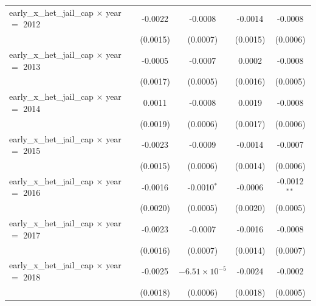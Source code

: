 \begin{tabular}{lcccc}
   early\_x\_het\_jail\_cap $\times$ year $=$ 2012      & -0.0022               & -0.0008                   & -0.0014                & -0.0008\\   
                                                        & (0.0015)              & (0.0007)                  & (0.0015)               & (0.0006)\\   
   early\_x\_het\_jail\_cap $\times$ year $=$ 2013      & -0.0005               & -0.0007                   & 0.0002                 & -0.0008\\   
                                                        & (0.0017)              & (0.0005)                  & (0.0016)               & (0.0005)\\   
   early\_x\_het\_jail\_cap $\times$ year $=$ 2014      & 0.0011                & -0.0008                   & 0.0019                 & -0.0008\\   
                                                        & (0.0019)              & (0.0006)                  & (0.0017)               & (0.0006)\\   
   early\_x\_het\_jail\_cap $\times$ year $=$ 2015      & -0.0023               & -0.0009                   & -0.0014                & -0.0007\\   
                                                        & (0.0015)              & (0.0006)                  & (0.0014)               & (0.0006)\\   
   early\_x\_het\_jail\_cap $\times$ year $=$ 2016      & -0.0016               & -0.0010$^{*}$             & -0.0006                & -0.0012$^{**}$\\   
                                                        & (0.0020)              & (0.0005)                  & (0.0020)               & (0.0005)\\   
   early\_x\_het\_jail\_cap $\times$ year $=$ 2017      & -0.0023               & -0.0007                   & -0.0016                & -0.0008\\   
                                                        & (0.0016)              & (0.0007)                  & (0.0014)               & (0.0007)\\   
   early\_x\_het\_jail\_cap $\times$ year $=$ 2018      & -0.0025               & $-6.51\times 10^{-5}$     & -0.0024                & -0.0002\\   
                                                        & (0.0018)              & (0.0006)                  & (0.0018)               & (0.0005)\\   

\end{tabular}
